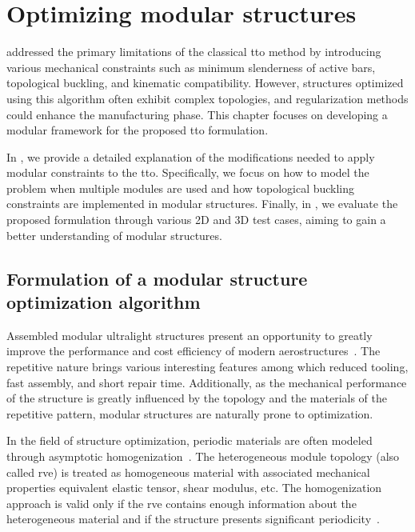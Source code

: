 \setchapterpreamble[u]{\margintoc}
\glsresetall %
\chapter{Optimizing modular structures} \label{chap:05}
 addressed the primary limitations of the classical \gls{tto} method by introducing various mechanical constraints such as minimum slenderness of active bars, topological buckling, and kinematic compatibility. However, structures optimized using this algorithm often exhibit complex topologies, and regularization methods could enhance the manufacturing phase. This chapter focuses on developing a modular framework for the proposed \gls{tto} formulation.

In , we provide a detailed explanation of the modifications needed to apply modular constraints to the \gls{tto}. Specifically, we focus on how to model the problem when multiple modules are used and how topological buckling constraints are implemented in modular structures. Finally, in , we evaluate the proposed formulation through various 2D and 3D test cases, aiming to gain a better understanding of modular structures.

\section{Formulation of a modular structure optimization algorithm} \label{sec:05_01}
Assembled modular ultralight structures present an opportunity to greatly improve the performance and cost efficiency of modern aerostructures~. The repetitive nature brings various interesting features among which reduced tooling, fast assembly, and short repair time. Additionally, as the mechanical performance of the structure is greatly influenced by the topology and the materials of the repetitive pattern, modular structures are naturally prone to optimization.

In the field of structure optimization, periodic materials are often modeled through asymptotic homogenization~. The heterogeneous module topology (also called \gls{rve}) is treated as homogeneous material with associated mechanical properties \ie equivalent elastic tensor, shear modulus, etc. The homogenization approach is valid only if the \gls{rve} contains enough information about the heterogeneous material and if the structure presents significant periodicity~. 

